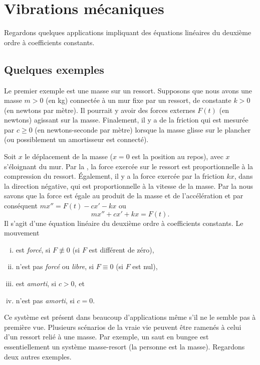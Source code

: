 \sectionnewpage
\section{Vibrations mécaniques} \label{sec:mv}


Regardons quelques applications impliquant des équations linéaires du deuxième ordre à coefficients constants. 
\subsection{Quelques exemples}

\begin{mywrapfigsimp}{2.0in}{2.3in}
\noindent
{}
\end{mywrapfigsimp}
Le premier exemple est une masse sur un ressort. Supposons que nous avons une masse $m > 0$ (en kg) connectée à un mur fixe par un ressort, de constante $k > 0$ (en newtons par mètre). Il pourrait y avoir des forces externes  $F(t)$ (en newtons) agissant sur la masse. Finalement, il y a de la friction qui est mesurée par $c \geq 0$ (en newtons-seconde par mètre) lorsque la masse glisse sur le plancher (ou possiblement un amortisseur est connecté). 

Soit $x$ le déplacement de la masse  ($x=0$ est la position au repos), avec
$x$ s'éloignant du mur.  
Par la , la force exercée sur le ressort est proportionnelle à la compression du ressort.
Également, il y a  la force exercée par la friction $kx$, dans la direction négative, qui est proportionnelle à la vitesse de la masse.
Par la  nous savons que la force est égale au produit de la masse et de l'accélération et par conséquent $mx'' = F(t)-cx'-kx$ ou
\begin{equation*}
mx'' + cx' + kx = F(t) .
\end{equation*}
Il s'agit d'une équation linéaire du deuxième ordre à coefficients constants. Le mouvement  
%
\begin{enumerate}[(i)]
\item  est \emph{forcé}, si $F \not\equiv 0$ (si $F$ est différent de zéro),
\item n'est pas \emph{ forcé } ou \emph{libre}, si $F \equiv 0$ (si $F$ est nul),
\item est \emph{amorti}, si $c > 0$, et
\item n'est pas \emph{amorti}, si $c = 0$.
\end{enumerate}
%
Ce système est présent dans beaucoup d'applications même s'il ne le semble pas à première vue. Plusieurs scénarios de la vraie vie peuvent être ramenés à celui d'un ressort relié à une masse. Par exemple, un saut en bungee est essentiellement un système masse-resort (la personne est la masse).  Regardons deux autres exemples.  

